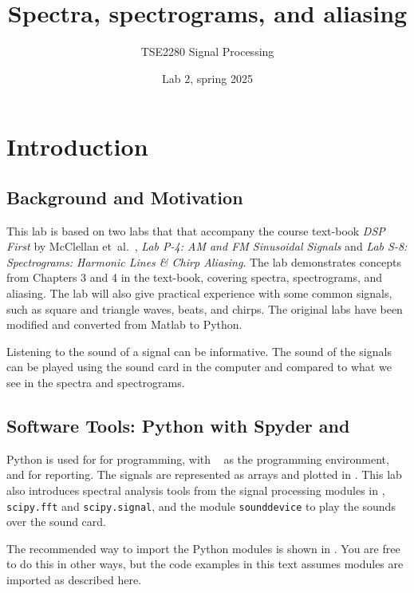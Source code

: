 
\setcounter{secnumdepth}{3}


\logo

\title{Spectra, spectrograms, and aliasing} 
\author{TSE2280 Signal Processing}
\date{Lab 2, spring 2025}
\maketitle

\thispagestyle{fancy}	

\section{Introduction}
\suppressfloats[t]
\subsection{Background and Motivation}
This lab is based on two labs that that accompany the course text-book \emph{DSP First} by McClellan et~al.~\cite{mcclellan_dsp_2016},  \emph{Lab P-4: AM and FM Sinusoidal Signals} and \emph{Lab S-8: Spectrograms: Harmonic Lines \& Chirp Aliasing}\cite{mcclellan_lab_2016}. 
The lab demonstrates concepts from Chapters 3 and 4 in the text-book, covering spectra, spectrograms, and aliasing.  The lab will also give practical experience with some common signals, such as square and triangle waves, beats, and chirps.  
The original labs have been modified and converted from Matlab to Python. 

Listening to the sound of a signal can be informative. The sound of the signals can be played using the sound card in the computer and compared to what we see in the spectra and spectrograms. 



\subsection{Software Tools: Python with Spyder and \jupyterlab}
Python is used for for programming, with \spyder~\cite{raybaut_spyder_2024} as the programming environment, and \jupyterlab for reporting.
The signals are represented as \numpy arrays and plotted in \matplotlib. 
This lab also introduces spectral analysis tools from the signal processing modules in \scipy, \texttt{scipy.fft} and \texttt{scipy.signal}, and the module \texttt{sounddevice} to play the sounds over the sound card.

The recommended way to import the Python modules is shown in . 
You are free to do this in other ways, but the code examples in this text assumes modules are imported as described here.

